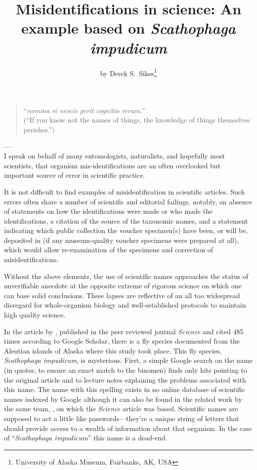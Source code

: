 \title{Misidentifications in science: An example based on \textit{Scathophaga impudicum}}

\subtitle{}

\author{by Derek S.\ Sikes\footnote{University of Alaska Museum, Fairbanks, AK, USA}}

\maketitle

\begin{quotation}
``{\itshape nomina si nescis perit cognitio rerum.}''\\
(``If you know not the names of things, the knowledge of things themselves perishes.'')
\end{quotation}

\hfill---\citet{Coke1628}
\\

I speak on behalf of many entomologists, naturalists, and hopefully most scientists, that organism mis-identifications are an often overlooked but important source of error in scientific practice.

It is not difficult to find examples of misidentification in scientific articles. Such errors often share a number of scientific and editorial failings, notably, an absence of statements on how the identifications were made or who made the identifications, a citation of the source of the taxonomic names, and a statement indicating which public collection the voucher specimen(s) have been, or will be, deposited in (if any museum-quality voucher specimens were prepared at all), which would allow re-examination of the specimens and correction of misidentifications. 

Without the above elements, the use of scientific names approaches the status of unverifiable anecdote at the opposite extreme of rigorous science on which one can base solid conclusions. These lapses are reflective of an all too widespread disregard for whole-organism biology and well-established protocols to maintain high quality science.

In the article by \citet{Croll2005}, published in the peer reviewed journal \textit{Science} and cited 485 times according to Google Scholar, there is a fly species documented from the Aleutian islands of Alaska where this study took place. This fly species, \textit{Scathophaga impudicum}, is mysterious. First, a simple Google search on the name (in quotes, to ensure an exact match to the binomen) finds only hits pointing to the original article and to lecture notes explaining the problems associated with this name. The name with this spelling exists in no online database of scientific names indexed by Google although it can also be found in the related work by the same team, \citet{Maronetal2006}, on which the \textit{Science} article was based. Scientific names are supposed to act a little like passwords---they’re a unique string of letters that should provide access to a wealth of information about that organism. In the case of “\textit{Scathophaga impudicum}” this name is a dead-end.

